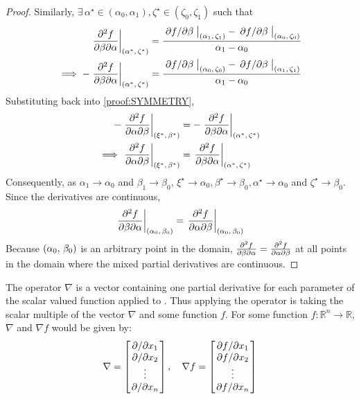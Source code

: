 \begin{lemma}
\begin{proof}
		Similarly, $\exists\,\alpha^\star\in(\alpha_0,\alpha_1),\zeta^\star\in(\zeta_0,\zeta_1)$ such that
		\begin{align*}
			\eval{\pdv{f}{\beta}{\alpha}}_{\point{\alpha^\star}{\zeta^\star}}&=\frac{\eval{\pdv*{f}{\beta}}_{\point{\alpha_1}{\zeta_1}}-\eval{\pdv*{f}{\beta}}_{\point{\alpha_0}{\zeta_0}}}{\alpha_1-\alpha_0}\\
			\implies-\eval{\pdv{f}{\beta}{\alpha}}_{\point{\alpha^\star}{\zeta^\star}}&=\frac{\eval{\pdv*{f}{\beta}}_{\point{\alpha_0}{\zeta_0}}-\eval{\pdv*{f}{\beta}}_{\point{\alpha_1}{\zeta_1}}}{\alpha_1-\alpha_0}
		\end{align*}
		Substituting back into \eqref{proof:SYMMETRY},
		\begin{align*}
			-\eval{\pdv{f}{\alpha}{\beta}}_{\point{\xi^\star}{\beta^\star}}&=-\eval{\pdv{f}{\beta}{\alpha}}_{\point{\alpha^\star}{\zeta^\star}}\\
			\implies\eval{\pdv{f}{\alpha}{\beta}}_{\point{\xi^\star}{\beta^\star}}&=\eval{\pdv{f}{\beta}{\alpha}}_{\point{\alpha^\star}{\zeta^\star}}
		\end{align*}
		Consequently, as $\alpha_1\rightarrow\alpha_0$ and $\beta_1\rightarrow\beta_0$, $\xi^\star\rightarrow\alpha_0,\beta^\star\rightarrow\beta_0,\alpha^\star\rightarrow\alpha_0$ 
		and $\zeta^\star\rightarrow\beta_0$. Since the derivatives are continuous,
		$$
			\eval{\pdv{f}{\beta}{\alpha}}_{\point{\alpha_0}{\beta_0}}=\eval{\pdv{f}{\alpha}{\beta}}_{\point{\alpha_0}{\beta_0}}
		$$
		Because $\left(\alpha_0,\,\beta_0\right)$ is an arbitrary point in the domain, $\pdv{f}{\beta}{\alpha}=\pdv{f}{\alpha}{\beta}$ at 
		all points in the domain where the mixed partial derivatives are continuous.
	\end{proof}
\end{lemma}
\begin{defn}
	The  operator $\nabla$ is a vector containing one partial derivative for each parameter of
	the scalar valued function applied to \cite{RAPP2017137}. Thus applying the operator is taking the scalar multiple of the vector 
	$\nabla$ and some function $f$. For some function $f:\mathbb{R}^n\rightarrow\mathbb{R}$, $\nabla$ and $\nabla f$
	would be given by:
	$$
	\nabla=\begin{bmatrix}
		\pdv*{x_1}\\
		\pdv*{x_2}\\
		\vdots\\
		\pdv*{x_n}
	\end{bmatrix},\quad
	\nabla f=\begin{bmatrix}
		\pdv*{f}{x_1}\\
		\pdv*{f}{x_2}\\
		\vdots\\
		\pdv*{f}{x_n}
	\end{bmatrix}
	$$
\end{defn}
